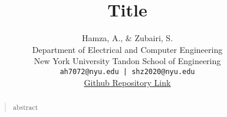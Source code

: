 \documentclass[letterpaper]{article}
\begin{document}
\title{Title}
\author{Hamza, A., \& Zubairi, S. \\
Department of Electrical and Computer Engineering\\
New York University Tandon School of Engineering\\
\texttt{ah7072@nyu.edu | shz2020@nyu.edu}\\
\href{https://github.com/hurryingauto3/ece-gy-7143-deeplearning/tree/main/project_2}{\underline{Github Repository Link}}\\ 
}
\maketitle
\begin{abstract}
\begin{quote}
abstract
\end{quote}
\end{abstract}
\end{document}
